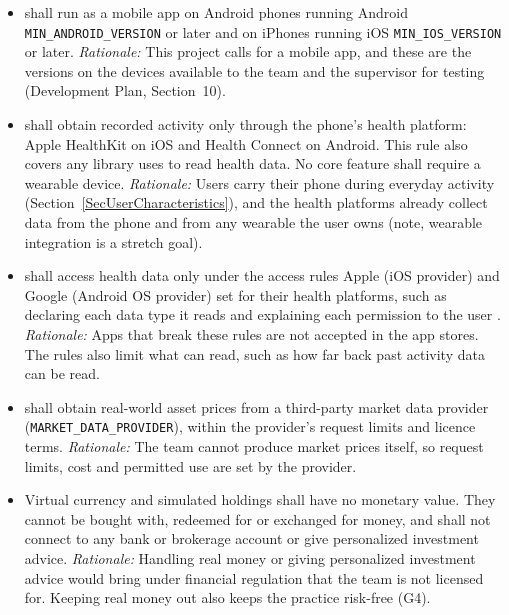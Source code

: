 \documentclass[12pt]{article}
\newcounter{scnum} %
\begin{document}
\begin{itemize}

\item[SC\refstepcounter{scnum}\thescnum \label{SC_Platform}:] \progname{} shall
run as a mobile app on Android phones running Android
\texttt{MIN\_ANDROID\_\allowbreak VERSION} or later and on iPhones running iOS
\texttt{MIN\_IOS\_\allowbreak VERSION} or later.
\textit{Rationale:} This project calls for a mobile app, and these are the
versions on the devices available to the team and the supervisor for testing
(Development Plan, Section~10).

\item[SC\refstepcounter{scnum}\thescnum \label{SC_HealthPlatform}:]
\progname{} shall obtain recorded activity only through the phone's health
platform: Apple HealthKit on iOS and Health Connect on Android. This rule also
covers any library \progname{} uses to read health data. No core feature shall
require a wearable device.
\textit{Rationale:} Users carry their phone during everyday activity
(Section~\ref{SecUserCharacteristics}), and the health platforms already
collect data from the phone and from any wearable the user owns (note, wearable
integration is a stretch goal).

\item[SC\refstepcounter{scnum}\thescnum \label{SC_HealthAccess}:] \progname{}
shall access health data only under the access rules Apple (iOS provider) and Google (Android OS provider) set for
their health platforms, such as declaring each data type it reads and
explaining each permission to the user \citep{AppleHealthKit,
GoogleHealthConnect}.
\textit{Rationale:} Apps that break these rules are not accepted in the app
stores. The rules also limit what \progname{} can read, such as how far back
past activity data can be read.

\item[SC\refstepcounter{scnum}\thescnum \label{SC_MarketData}:] \progname{}
shall obtain real-world asset prices from a third-party market data provider
(\texttt{MARKET\_DATA\_PROVIDER}), within the provider's request limits and
licence terms.
\textit{Rationale:} The team cannot produce market prices itself, so request
limits, cost and permitted use are set by the provider.

\item[SC\refstepcounter{scnum}\thescnum \label{SC_NoRealMoney}:] Virtual
currency and simulated holdings shall have no monetary value. They cannot be
bought with, redeemed for or exchanged for money, and \progname{} shall not
connect to any bank or brokerage account or give personalized investment
advice.
\textit{Rationale:} Handling real money or giving personalized investment advice would bring
\progname{} under financial regulation that the team is not licensed for.
Keeping real money out also keeps the practice risk-free (G4).


\end{itemize}
\end{document}
